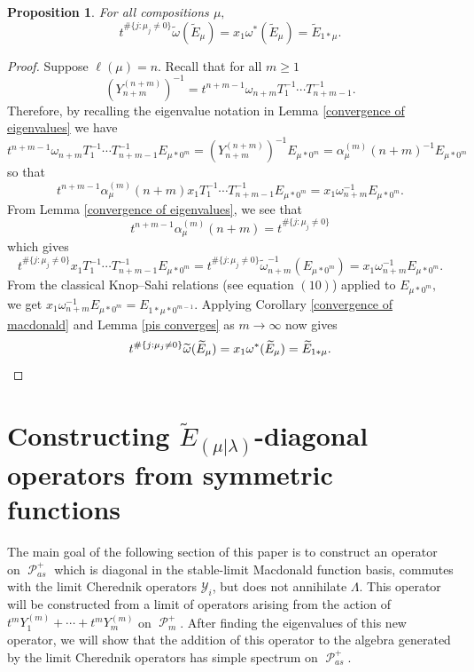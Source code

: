 \documentclass[11pt]{article}
\newtheorem{prop}[theo]{Proposition}
\theoremstyle{definition}
\numberwithin{equation}{section}
\newcommand{\y}{{ \mathscr{Y} }}
\DeclareMathOperator{\sP}{\mathscr{P} }
\begin{document}
\begin{prop}
    For all compositions $\mu,$ 
    \begin{equation}
        t^{\#\{j:\mu_j \neq 0\}}\widetilde{\omega}( \widetilde{E}_{\mu}) = x_1 \omega^{*}(\widetilde{E}_{\mu}) = \widetilde{E}_{1*\mu}.
    \end{equation}
\end{prop}
\begin{proof}
    Suppose $\ell(\mu) = n$. Recall that for all $m \geq 1$
    $$(Y^{(n+m)}_{n+m})^{-1} = t^{n+m-1} \omega_{n+m}T_1^{-1}\cdots T_{n+m-1}^{-1}.$$ Therefore, by recalling the eigenvalue notation in Lemma \ref{convergence of eigenvalues} we have 
    $$t^{n+m-1} \omega_{n+m}T_1^{-1}\cdots T_{n+m-1}^{-1}E_{\mu*0^m} = (Y^{(n+m)}_{n+m})^{-1} E_{\mu*0^m} = \alpha_{\mu}^{(m)}(n+m)^{-1}E_{\mu*0^m}$$
    so that 
    $$t^{n+m-1}\alpha_{\mu}^{(m)}(n+m) x_1 T_1^{-1}\cdots T_{n+m-1}^{-1}E_{\mu*0^m} = x_1 \omega_{n+m}^{-1}E_{\mu*0^m}.$$
    From Lemma \ref{convergence of eigenvalues}, we see that 
    $$t^{n+m-1}\alpha_{\mu}^{(m)}(n+m) = t^{\#\{j:\mu_j \neq 0\}}$$
    which gives 
    $$t^{\#\{j:\mu_j \neq 0\}} x_1 T_1^{-1}\cdots T_{n+m-1}^{-1}E_{\mu*0^m} = t^{\#\{j:\mu_j \neq 0\}} \widetilde{\omega}_{n+m}^{-1}(E_{\mu*0^m}) = x_1 \omega_{n+m}^{-1}E_{\mu*0^m}. $$
    From the classical Knop--Sahi relations (see \cite{haglund2007combinatorial} equation $(10)$) applied to $E_{\mu*0^m},$ we get 
    $x_1 \omega_{n+m}^{-1}E_{\mu*0^m} = E_{1*\mu*0^{m-1}}.$
    Applying Corollary \ref{convergence of macdonald} and Lemma \ref{pis converges} as $m \rightarrow \infty$ now gives 
    \[t^{\#\{j:\mu_j \neq 0\}}\widetilde{\omega}(\widetilde{E}_{\mu}) = x_1 \omega^{*}(\widetilde{E}_{\mu}) = \widetilde{E}_{1*\mu}. \qedhere\]
\end{proof}


\section{Constructing \texorpdfstring{$\widetilde{E}_{(\mu|\lambda)}$}{E\_(mu | lambda)}-diagonal operators from symmetric functions}\label{one dim wt spaces section}

The main goal of the following section of this paper is to construct an operator on $\sP_{as}^{+}$ which is diagonal in the stable-limit Macdonald function basis, commutes with the limit Cherednik operators $\y_i$, but does not annihilate $\Lambda$. This operator will be constructed from a limit of operators arising from the action of $t^mY^{(m)}_1+ \cdots +t^m Y^{(m)}_m$ on $\sP_m^{+}$. After finding the eigenvalues of this new operator, we will show that the addition of this operator to the algebra generated by the limit Cherednik operators has simple spectrum on $\sP_{as}^{+}$.
\end{document}
